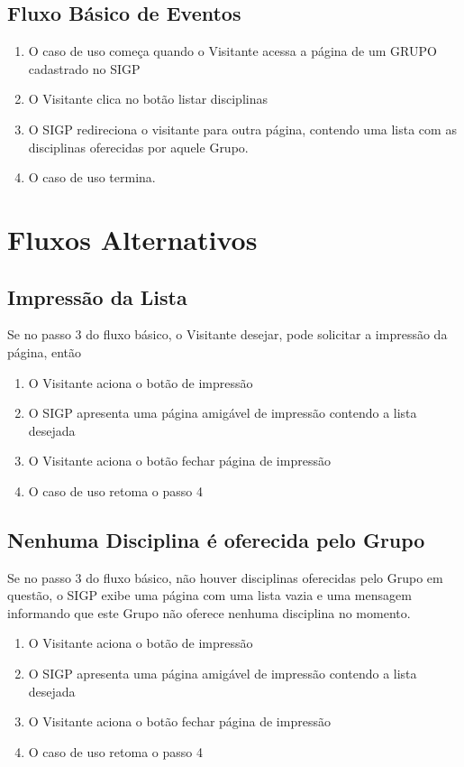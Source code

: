 \documentclass[11pt, a4paper,oneside]{book}
\begin{document}
\subsection{Fluxo Básico de Eventos}

\begin{enumerate}
\item O caso de uso começa quando o Visitante acessa a página de um GRUPO cadastrado no SIGP
\item O Visitante clica no botão listar disciplinas
\item O SIGP redireciona o visitante para outra página, contendo uma lista com as disciplinas oferecidas por aquele Grupo.
\item O caso de uso termina.
\end{enumerate}

\section{Fluxos Alternativos}

\subsection{Impressão da Lista}
Se no passo $3$ do fluxo básico, o Visitante desejar, pode solicitar a impressão da página, então

\begin{enumerate}
\item O Visitante aciona o botão de impressão
\item O SIGP apresenta uma página amigável de impressão contendo a lista desejada
\item O Visitante aciona o botão fechar página de impressão
\item O caso de uso retoma o passo 4
\end{enumerate}

\subsection{Nenhuma Disciplina é oferecida pelo Grupo}
Se no passo $3$ do fluxo básico, não houver disciplinas oferecidas pelo Grupo em questão, o SIGP exibe uma página com uma lista vazia e uma mensagem informando que este Grupo não oferece nenhuma disciplina no momento.

\begin{enumerate}
\item O Visitante aciona o botão de impressão
\item O SIGP apresenta uma página amigável de impressão contendo a lista desejada
\item O Visitante aciona o botão fechar página de impressão
\item O caso de uso retoma o passo 4
\end{enumerate}
\end{document}

